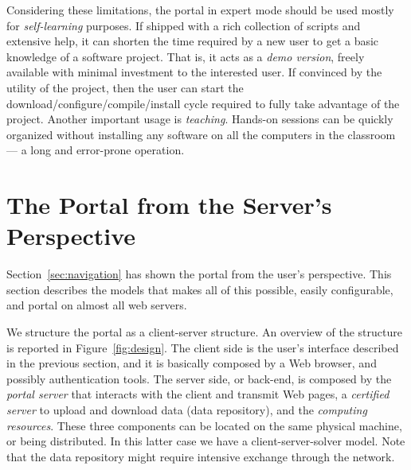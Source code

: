 \documentclass[11pt,relax]{SANDreport}
\begin{document}
Considering these limitations, the portal in expert mode should be used mostly
for {\sl self-learning} purposes. If shipped with a rich collection of
scripts and extensive help, it can shorten the time required by a new user to
get a basic knowledge of a software project. That is, it acts as a {\sl demo
version}, freely available with minimal investment to the interested user.
If convinced by the utility of the project, then the user can start the
download/configure/compile/install cycle required to fully take advantage of
the project. Another important usage is {\sl teaching}. Hands-on sessions can
be quickly organized without installing any software on all the computers in
the classroom --- a long and error-prone operation.

\section{The Portal from the Server's Perspective}
\label{sec:computational}

Section~\ref{sec:navigation} has shown the portal from the user's perspective.
This section describes the models that makes all of this possible, easily
configurable, and portal on almost all web servers.

We structure the portal as a client-server structure. 
An overview of the structure is reported in Figure~\ref{fig:design}.
The client side is the
user's interface described in the previous section, and it is 
basically composed by a Web browser, and possibly
authentication tools. The server side, or back-end, is composed by 
the {\sl portal server} that interacts with the client and transmit Web pages,
a {\sl certified server} to upload and download data (data repository), and the {\sl computing
  resources}. These three components can be located on the same physical
  machine, or being distributed. In this latter case we have a
  client-server-solver model. Note that the data repository might require
intensive exchange through the network. 
\end{document}
